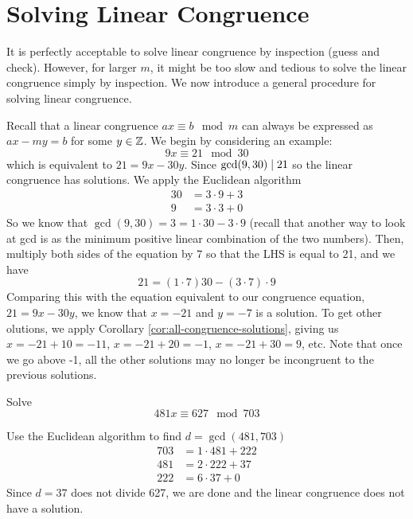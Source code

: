 \section{Solving Linear Congruence}

It is perfectly acceptable to solve linear congruence by inspection (guess and check). However, for larger $m$, it might be too slow and tedious to solve the linear congruence simply by inspection. We now introduce a general procedure for solving linear congruence.

Recall that a linear congruence $ax \equiv b \mod m$ can always be expressed as $ax - my = b$ for some $y \in \mathbb{Z}$. We begin by considering an example:
$$
9x \equiv 21 \mod 30
$$
which is equivalent to $21 = 9x - 30y$. Since $\gcd(9,30) \mathrel{\mid} 21$ so the linear congruence has solutions. We apply the Euclidean algorithm
$$
\begin{aligned}
    30 &= 3 \cdot 9 + \boxed{3} \\
    9 &= 3 \cdot 3 + 0
\end{aligned}
$$
So we know that $\gcd(9,30) = 3 = 1 \cdot 30 - 3 \cdot 9$ (recall that another way to look at gcd is as the minimum positive linear combination of the two numbers). Then, multiply both sides of the equation by 7 so that the LHS is equal to 21, and we have
$$
21 = (1 \cdot 7) 30 - (3 \cdot 7) \cdot 9
$$
Comparing this with the equation equivalent to our congruence equation, $21 = 9x - 30y$, we know that $x = -21$ and $y = -7$ is a solution. To get other olutions, we apply Corollary \ref{cor:all-congruence-solutions}, giving us $x = -21 + 10 = -11$, $x = -21 + 20 = -1$, $x = -21 + 30 = 9$, etc. Note that once we go above -1, all the other solutions may no longer be incongruent to the previous solutions.

\begin{example}
    Solve
    $$
    481x \equiv 627 \mod 703
    $$
\end{example}
Use the Euclidean algorithm to find $d = \gcd(481, 703)$ 
$$
\begin{aligned}
    703 &= 1 \cdot 481 + 222 \\
    481 &= 2 \cdot 222 + \boxed{37} \\
    222 &= 6 \cdot 37 + 0
\end{aligned}
$$
Since $d = 37$ does not divide 627, we are done and the linear congruence does not have a solution.

